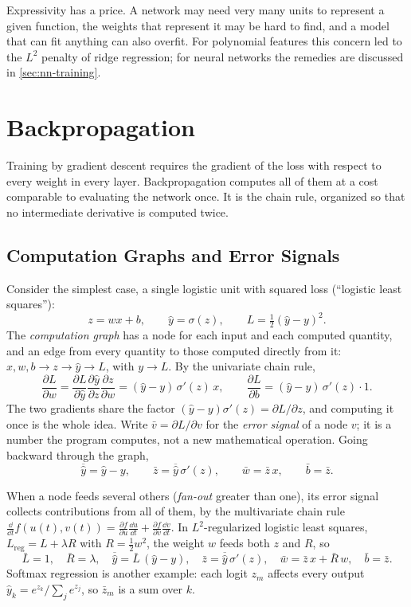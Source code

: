 Expressivity has a price. A network may need very many units to represent a given function, the weights that represent it may be hard to find, and a model that can fit anything can also overfit. For polynomial features this concern led to the $L^2$ penalty of ridge regression; for neural networks the remedies are discussed in \cref{sec:nn-training}.

\section{Backpropagation}\label{sec:backprop}

Training by gradient descent requires the gradient of the loss with respect to every weight in every layer. Backpropagation computes all of them at a cost comparable to evaluating the network once. It is the chain rule, organized so that no intermediate derivative is computed twice.

\subsection{Computation Graphs and Error Signals}

Consider the simplest case, a single logistic unit with squared loss (``logistic least squares''):
\[
z=wx+b,\qquad \hat y=\sigma(z),\qquad L=\tfrac12(\hat y-y)^2 .
\]
The \emph{computation graph} has a node for each input and each computed quantity, and an edge from every quantity to those computed directly from it: $x,w,b\to z\to\hat y\to L$, with $y\to L$. By the univariate chain rule,
\[
\frac{\partial L}{\partial w}=\frac{\partial L}{\partial\hat y}\frac{\partial\hat y}{\partial z}\frac{\partial z}{\partial w}=(\hat y-y)\,\sigma'(z)\,x,\qquad
\frac{\partial L}{\partial b}=(\hat y-y)\,\sigma'(z)\cdot1 .
\]
The two gradients share the factor $(\hat y-y)\sigma'(z)=\partial L/\partial z$, and computing it once is the whole idea. Write $\bar v=\partial L/\partial v$ for the \emph{error signal} of a node $v$; it is a number the program computes, not a new mathematical operation. Going backward through the graph,
\[
\overline{\hat y}=\hat y-y,\qquad \bar z=\overline{\hat y}\,\sigma'(z),\qquad \bar w=\bar z\,x,\qquad \bar b=\bar z .
\]

When a node feeds several others (\emph{fan-out} greater than one), its error signal collects contributions from all of them, by the multivariate chain rule $\frac{\dd}{\dd t}f(u(t),v(t))=\frac{\partial f}{\partial u}\frac{\dd u}{\dd t}+\frac{\partial f}{\partial v}\frac{\dd v}{\dd t}$. In $L^2$-regularized logistic least squares, $L_{\mathrm{reg}}=L+\lambda R$ with $R=\frac12w^2$, the weight $w$ feeds both $z$ and $R$, so
\[
\bar L=1,\quad \bar R=\lambda,\quad \overline{\hat y}=\bar L\,(\hat y-y),\quad \bar z=\overline{\hat y}\,\sigma'(z),\quad \bar w=\bar z\,x+\bar R\,w,\quad \bar b=\bar z .
\]
Softmax regression is another example: each logit $z_m$ affects every output $\hat y_k=e^{z_k}/\sum_je^{z_j}$, so $\bar z_m$ is a sum over $k$.


